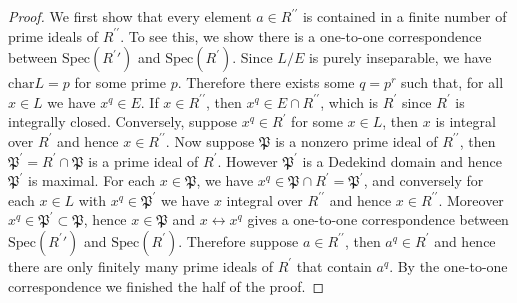\begin{proof}
We first show that every element $a\in R^{\prime\prime}$ is contained in a finite number of prime ideals of $R^{\prime\prime}$. To see this, we show there is a one-to-one correspondence between $\mathrm{Spec}(R^\prime\prime)$ and $\mathrm{Spec}(R^\prime)$. Since $L/E$ is purely inseparable, we have $\mathrm{char}L=p$ for some prime $p$. Therefore there exists some $q=p^r$ such that, for all $x\in L$ we have $x^q\in E$. If $x\in R^{\prime\prime}$, then $x^q\in E\cap R^{\prime\prime}$, which is $R^\prime$ since $R^\prime$ is integrally closed. Conversely, suppose $x^q\in R^\prime$ for some $x\in L$, then $x$ is integral over $R^\prime$ and hence $x\in R^{\prime\prime}$. Now suppose $\mathfrak{P}$ is a nonzero prime ideal of $R^{\prime\prime}$, then $\mathfrak{P}^\prime=R^\prime\cap\mathfrak{P}$ is a prime ideal of $R^\prime$. However $\mathfrak{P}^\prime$ is a Dedekind domain and hence $\mathfrak{P}^\prime$ is maximal. For each $x\in\mathfrak{P}$, we have $x^q\in\mathfrak{P}\cap R^\prime=\mathfrak{P}^\prime$, and conversely for each $x\in L$ with $x^q\in\mathfrak{P}^\prime$ we have $x$ integral over $R^{\prime\prime}$ and hence $x\in R^{\prime\prime}$. Moreover $x^q\in\mathfrak{P}^\prime\subset\mathfrak{P}$, hence $x\in\mathfrak{P}$ and $x\leftrightarrow x^q$ gives a one-to-one correspondence between $\mathrm{Spec}(R^\prime\prime)$ and $\mathrm{Spec}(R^\prime)$. Therefore suppose $a\in R^{\prime\prime}$, then $a^q\in R^\prime$ and hence there are only finitely many prime ideals of $R^\prime$ that contain $a^q$. By the one-to-one correspondence we finished the half of the proof.\par

\end{proof}
